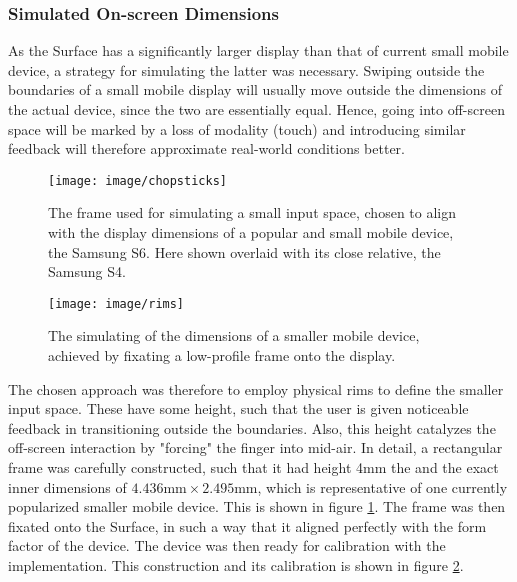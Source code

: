 \subsubsection{Simulated On-screen Dimensions}

As the Surface has a significantly larger display than that of current small mobile device, a strategy for simulating the latter was necessary. Swiping outside the boundaries of a small mobile display will usually move outside the dimensions of the actual device, since the two are essentially equal. Hence, going into off-screen space will be marked by a loss of modality (touch) and introducing similar feedback will  therefore approximate real-world conditions better.

\begin{figure}[!b]
	\centering
	\texttt{[image: image/chopsticks]}
	\caption{The frame used for simulating a small input space, chosen to align with the display dimensions of a popular and small mobile device, the Samsung S6. Here shown overlaid with its close relative, the Samsung S4.}
	\label{fig:chopsticks}
\end{figure}

\begin{figure}
	\centering
    \texttt{[image: image/rims]}
	\caption{The simulating of the dimensions of a smaller mobile device, achieved by fixating a low-profile frame onto the display.}
	\label{fig:rims}
\end{figure}



The chosen approach was therefore to employ physical rims to define the smaller input space. These have some height, such that the user is given noticeable feedback in transitioning outside the boundaries. Also, this height catalyzes the off-screen interaction by "forcing" the finger into mid-air. In detail, a rectangular frame  was carefully constructed, such that it had height 4mm the and the exact inner dimensions of $4.436 \text{mm} \times 2.495  \text{mm}$, which is representative of one currently popularized smaller mobile device. This is  shown  in figure \ref{fig:chopsticks}. The frame was then fixated onto the Surface, in such a way that it aligned perfectly with the form factor of the device. The device was then  ready for calibration with the implementation. This construction and its calibration is shown in figure \ref{fig:rims}. 



















